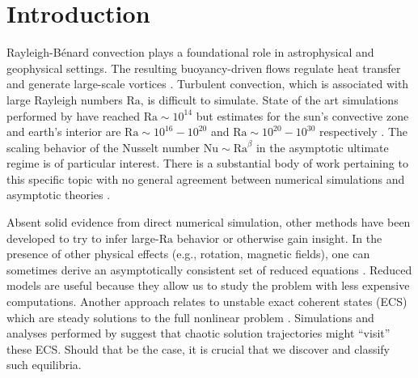 \documentclass[reprint,amsmath,amssymb,aps,nofootinbib]{revtex4-1}
\newcommand\Ra{\mathrm{Ra}}
\newcommand\Nu{\mathrm{Nu}}
\begin{document}
\section{Introduction}
Rayleigh-B\'enard convection plays a foundational role in astrophysical and geophysical settings.
The resulting buoyancy-driven flows regulate heat transfer and generate large-scale vortices \cite{Couston}.
Turbulent convection, which is associated with large Rayleigh numbers $\Ra$, is difficult to simulate. 
State of the art simulations performed by \cite{Zhu_2018} have reached $\Ra \sim 10^{14}$ but estimates for the sun's convective zone and earth's interior are $\Ra \sim 10^{16}-10^{20}$ and $\Ra \sim 10^{20}-10^{30}$ respectively \cite{Ossendrijver,Gubbins_2001}. 
The scaling behavior of the Nusselt number $\Nu \sim \Ra^{\beta}$ in the asymptotic ultimate regime is of particular interest.
There is a substantial body of work pertaining to this specific topic with no general agreement between numerical simulations and asymptotic theories \cite{Malkus_1954, Howard_1966, Kraichnan, Spiegel, Castaing, Grossman, Ahlers}. 

Absent solid evidence from direct numerical simulation, other methods have been developed to try to infer large-$\Ra$ behavior or otherwise gain insight.
In the presence of other physical effects (e.g., rotation, magnetic fields), one can sometimes derive an asymptotically consistent set of reduced equations \cite{Julien2007, Julien2012}.
Reduced models are useful because they allow us to study the problem with less expensive computations.
Another approach relates to unstable exact coherent states (ECS) which are steady solutions to the full nonlinear problem \cite{Waleffe, Sondak, Wen, chini_cells}. 
Simulations and analyses performed by \cite{Yalniz, Cvitanovic} suggest that chaotic solution trajectories might ``visit'' these ECS.
Should that be the case, it is crucial that we discover and classify such equilibria. 
\end{document}
